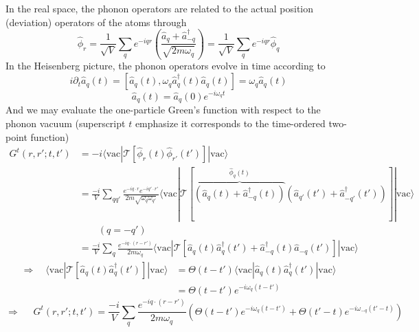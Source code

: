 In the real space, the phonon operators are related to the actual position (deviation) operators of the atoms through
\[ \hat{\phi}_r=\frac{1}{\sqrt{V}}\sum_q{e^{-iqr}\left( \frac{\hat{a}_q+\hat{a}_{-q}^{\dagger}}{\sqrt{2m\omega _q}} \right)}=\frac{1}{\sqrt{V}}\sum_q{e^{-iqr}\hat{\phi}_q}\]
In the Heisenberg picture, the phonon operators evolve in time according to
\[ i\partial _t\hat{a}_q\left( t \right) =\left[ \hat{a}_q\left( t \right) ,\omega _q\hat{a}_{q}^{\dagger}\left( t \right) \hat{a}_q\left( t \right) \right] =\omega _q\hat{a}_q\left( t \right) \]
\[ \hat{a}_q\left( t \right) =\hat{a}_q\left( 0 \right) e^{-i\omega _qt}\]
And we may evaluate the one-particle Green's function with respect to the phonon vacuum (superscript $t$ emphasize it corresponds to the time-ordered two-point function)
\begin{align*}
    G^t\left( r,r';t,t' \right) &=-i\langle \mathrm{vac}|\mathcal{T} \left[ \hat{\phi}_r\left( t \right) \hat{\phi}_{r'}\left( t' \right) \right] |\mathrm{vac}\rangle \\
    &=\frac{-i}{V}\sum_{qq'}{\frac{e^{-iq\cdot r}e^{-iq'\cdot r'}}{2m\sqrt{\omega _q\omega _{q'}}}\langle \mathrm{vac}|\mathcal{T} \left[ \overset{\hat{\phi}_q\left( t \right)}{\overbrace{\left( \hat{a}_q\left( t \right) +\hat{a}_{-q}^{\dagger}\left( t \right) \right) }}\left( \hat{a}_{q'}\left( t' \right) +\hat{a}_{-q'}^{\dagger}\left( t' \right) \right) \right] |\mathrm{vac}\rangle}\\
    & \qquad\left( q=-q' \right) \\
    &=\frac{-i}{V}\sum_q{\frac{e^{-iq\cdot \left( r-r' \right)}}{2m\omega _q}\langle \mathrm{vac}|\mathcal{T} \left[ \hat{a}_q\left( t \right) \hat{a}_{q}^{\dagger}\left( t' \right) +\hat{a}_{-q}^{\dagger}\left( t \right) \hat{a}_{-q}\left( t' \right) \right] |\mathrm{vac}\rangle}
\end{align*}
\begin{align*}
    \Rightarrow \quad \langle \mathrm{vac}|\mathcal{T} \left[ \hat{a}_q\left( t \right) \hat{a}_{q}^{\dagger}\left( t' \right) \right] |\mathrm{vac}\rangle &=\Theta \left( t-t' \right) \langle \mathrm{vac}|\hat{a}_q\left( t \right) \hat{a}_{q}^{\dagger}\left( t' \right) |\mathrm{vac}\rangle \\
    &=\Theta \left( t-t' \right) e^{-i\omega _q\left( t-t' \right)}
\end{align*}
\[ \Rightarrow \quad \,\,G^t\left( r,r';t,t' \right) =\frac{-i}{V}\sum_q{\frac{e^{-iq\cdot \left( r-r' \right)}}{2m\omega _q}\left( \Theta \left( t-t' \right) e^{-i\omega _q\left( t-t' \right)}+\Theta \left( t'-t \right) e^{-i\omega _{-q}\left( t'-t \right)} \right)}\]
